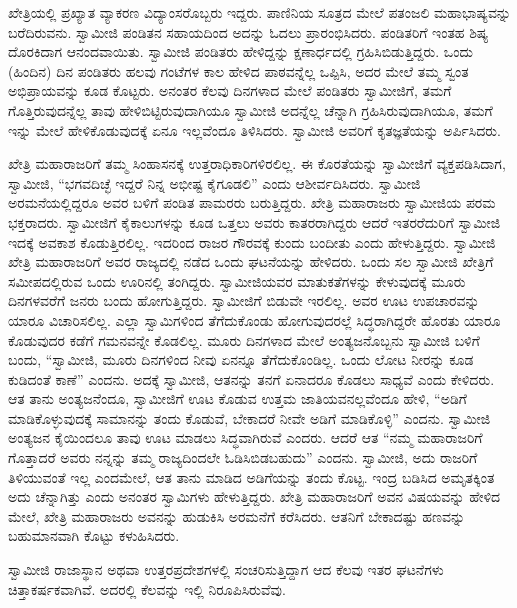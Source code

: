  ಖೇತ್ರಿಯಲ್ಲಿ ಪ್ರಖ್ಯಾತ ವ್ಯಾಕರಣ ವಿದ್ಯಾಂಸರೊಬ್ಬರು ಇದ್ದರು. ಪಾಣಿನಿಯ ಸೂತ್ರದ ಮೇಲೆ ಪತಂಜಲಿ ಮಹಾಭಾಷ್ಯವನ್ನು ಬರೆದಿರುವನು. ಸ್ವಾಮೀಜಿ ಪಂಡಿತನ ಸಹಾಯದಿಂದ ಅದನ್ನು ಓದಲು ಪ್ರಾರಂಭಿಸಿದರು. ಪಂಡಿತರಿಗೆ ಇಂತಹ ಶಿಷ್ಯ ದೊರಕಿದಾಗ ಆನಂದವಾಯಿತು. ಸ್ವಾಮೀಜಿ ಪಂಡಿತರು ಹೇಳಿದ್ದನ್ನು ಕ್ಷಣಾರ್ಧದಲ್ಲಿ ಗ್ರಹಿಸಿಬಿಡುತ್ತಿದ್ದರು. ಒಂದು (ಹಿಂದಿನ) ದಿನ ಪಂಡಿತರು ಹಲವು ಗಂಟೆಗಳ ಕಾಲ ಹೇಳಿದ ಪಾಠವನ್ನೆಲ್ಲ ಒಪ್ಪಿಸಿ, ಅದರ ಮೇಲೆ ತಮ್ಮ ಸ್ವಂತ ಅಭಿಪ್ರಾಯವನ್ನು ಕೂಡ ಕೊಟ್ಟರು. ಅನಂತರ ಕೆಲವು ದಿನಗಳಾದ ಮೇಲೆ ಪಂಡಿತರು ಸ್ವಾಮೀಜಿಗೆ, ತಮಗೆ ಗೊತ್ತಿರುವುದನ್ನೆಲ್ಲ ತಾವು ಹೇಳಿಬಿಟ್ಟಿರುವುದಾಗಿಯೂ ಸ್ವಾಮೀಜಿ ಅದನ್ನೆಲ್ಲ ಚೆನ್ನಾಗಿ ಗ್ರಹಿಸಿರುವುದಾಗಿಯೂ, ತಮಗೆ ಇನ್ನು ಮೇಲೆ ಹೇಳಿಕೊಡುವುದಕ್ಕೆ ಏನೂ ಇಲ್ಲವೆಂದೂ ತಿಳಿಸಿದರು. ಸ್ವಾಮೀಜಿ ಅವರಿಗೆ ಕೃತಜ್ಞತೆಯನ್ನು ಅರ್ಪಿಸಿದರು. 

 ಖೇತ್ರಿ ಮಹಾರಾಜರಿಗೆ ತಮ್ಮ ಸಿಂಹಾಸನಕ್ಕೆ ಉತ್ತರಾಧಿಕಾರಿಗಳಿರಲಿಲ್ಲ. ಈ ಕೊರತೆಯನ್ನು ಸ್ವಾಮೀಜಿಗೆ ವ್ಯಕ್ತಪಡಿಸಿದಾಗ, ಸ್ವಾಮೀಜಿ, “ಭಗವದಿಚ್ಛೆ ಇದ್ದರೆ ನಿನ್ನ ಅಭೀಷ್ಟ ಕೈಗೂಡಲಿ” ಎಂದು ಆಶೀರ್ವದಿಸಿದರು. ಸ್ವಾಮೀಜಿ ಅರಮನೆಯಲ್ಲಿದ್ದರೂ ಅವರ ಬಳಿಗೆ ಪಂಡಿತ ಪಾಮರರು ಬರುತ್ತಿದ್ದರು. ಖೇತ್ರಿ ಮಹಾರಾಜರು ಸ್ವಾಮೀಜಿಯ ಪರಮ ಭಕ್ತರಾದರು. ಸ್ವಾಮೀಜಿಗೆ ಕೈಕಾಲುಗಳನ್ನು ಕೂಡ ಒತ್ತಲು ಅವರು ಕಾತರರಾಗಿದ್ದರು ಆದರೆ ಇತರರೆದುರಿಗೆ ಸ್ವಾಮೀಜಿ ಇದಕ್ಕೆ ಅವಕಾಶ ಕೊಡುತ್ತಿರಲಿಲ್ಲ. ಇದರಿಂದ ರಾಜರ ಗೌರವಕ್ಕೆ ಕುಂದು ಬಂದೀತು ಎಂದು ಹೇಳುತ್ತಿದ್ದರು. ಸ್ವಾಮೀಜಿ ಖೇತ್ರಿ ಮಹಾರಾಜರಿಗೆ ಅವರ ರಾಜ್ಯದಲ್ಲಿ ನಡೆದ ಒಂದು ಘಟನೆಯನ್ನು ಹೇಳಿದರು. ಒಂದು ಸಲ ಸ್ವಾಮೀಜಿ ಖೇತ್ರಿಗೆ ಸಮೀಪದಲ್ಲಿರುವ ಒಂದು ಊರಿನಲ್ಲಿ ತಂಗಿದ್ದರು. ಸ್ವಾಮೀಜಿಯವರ ಮಾತುಕತೆಗಳನ್ನು ಕೇಳುವುದಕ್ಕೆ ಮೂರು ದಿನಗಳವರೆಗೆ ಜನರು ಬಂದು ಹೋಗುತ್ತಿದ್ದರು. ಸ್ವಾಮೀಜಿಗೆ ಬಿಡುವೇ ಇರಲಿಲ್ಲ. ಅವರ ಊಟ ಉಪಚಾರವನ್ನು ಯಾರೂ ವಿಚಾರಿಸಲಿಲ್ಲ. ಎಲ್ಲಾ ಸ್ವಾಮಿಗಳಿಂದ ತೆಗೆದುಕೊಂಡು ಹೋಗುವುದರಲ್ಲೆ ಸಿದ್ಧರಾಗಿದ್ದರೇ ಹೊರತು ಯಾರೂ ಕೊಡುವುದರ ಕಡೆಗೆ ಗಮನವನ್ನೇ ಕೊಡಲಿಲ್ಲ. ಮೂರು ದಿನಗಳಾದ ಮೇಲೆ ಅಂತ್ಯಜನೊಬ್ಬನು ಸ್ವಾಮೀಜಿ ಬಳಿಗೆ ಬಂದು, “ಸ್ವಾಮೀಜಿ, ಮೂರು ದಿನಗಳಿಂದ ನೀವು ಏನನ್ನೂ ತೆಗೆದುಕೊಂಡಿಲ್ಲ. ಒಂದು ಲೋಟ ನೀರನ್ನು ಕೂಡ ಕುಡಿದಂತೆ ಕಾಣೆ” ಎಂದನು. ಅದಕ್ಕೆ ಸ್ವಾಮೀಜಿ, ಆತನನ್ನು ತನಗೆ ಏನಾದರೂ ಕೊಡಲು ಸಾಧ್ಯವೆ ಎಂದು ಕೇಳಿದರು. ಆತ ತಾನು ಅಂತ್ಯಜನೆಂದೂ, ಸ್ವಾಮೀಜಿಗೆ ಊಟ ಕೊಡುವ ಉತ್ತಮ ಜಾತಿಯವನಲ್ಲವೆಂದೂ ಹೇಳಿ, “ಅಡಿಗೆ ಮಾಡಿಕೊಳ್ಳುವುದಕ್ಕೆ ಸಾಮಾನನ್ನು ತಂದು ಕೊಡುವೆ, ಬೇಕಾದರೆ ನೀವೇ ಅಡಿಗೆ ಮಾಡಿಕೊಳ್ಳಿ” ಎಂದನು. ಸ್ವಾಮೀಜಿ ಅಂತ್ಯಜನ ಕೈಯಿಂದಲೂ ತಾವು ಊಟ ಮಾಡಲು ಸಿದ್ಧವಾಗಿರುವೆ ಎಂದರು. ಆದರೆ ಆತ “ನಮ್ಮ ಮಹಾರಾಜರಿಗೆ ಗೊತ್ತಾದರೆ ಅವರು ನನ್ನನ್ನು ತಮ್ಮ ರಾಜ್ಯದಿಂದಲೇ ಓಡಿಸಿಬಿಡಬಹುದು” ಎಂದನು. ಸ್ವಾಮೀಜಿ, ಅದು ರಾಜರಿಗೆ ತಿಳಿಯುವಂತೆ ಇಲ್ಲ ಎಂದಮೇಲೆ, ಆತ ತಾನು ಮಾಡಿದ ಅಡಿಗೆಯನ್ನು ತಂದು ಕೊಟ್ಟ. ಇಂದ್ರ ಬಡಿಸಿದ ಅಮೃತಕ್ಕಿಂತ ಅದು ಚೆನ್ನಾಗಿತ್ತು ಎಂದು ಅನಂತರ ಸ್ವಾಮಿಗಳು ಹೇಳುತ್ತಿದ್ದರು. ಖೇತ್ರಿ ಮಹಾರಾಜರಿಗೆ ಅವನ ವಿಷಯವನ್ನು ಹೇಳಿದ ಮೇಲೆ, ಖೇತ್ರಿ ಮಹಾರಾಜರು ಅವನನ್ನು ಹುಡುಕಿಸಿ ಅರಮನೆಗೆ ಕರೆಸಿದರು. ಆತನಿಗೆ ಬೇಕಾದಷ್ಟು ಹಣವನ್ನು ಬಹುಮಾನವಾಗಿ ಕೊಟ್ಟು ಕಳುಹಿಸಿದರು. 

 ಸ್ವಾಮೀಜಿ ರಾಜಾಸ್ಥಾನ ಅಥವಾ ಉತ್ತರಪ್ರದೇಶಗಳಲ್ಲಿ ಸಂಚರಿಸುತ್ತಿದ್ದಾಗ ಆದ ಕೆಲವು ಇತರ ಘಟನೆಗಳು ಚಿತ್ತಾಕರ್ಷಕವಾಗಿವೆ. ಅದರಲ್ಲಿ ಕೆಲವನ್ನು ಇಲ್ಲಿ ನಿರೂಪಿಸಿರುವೆವು. 

